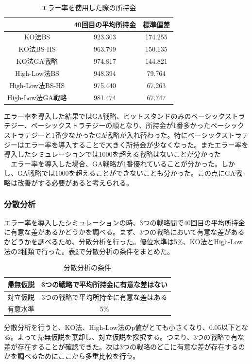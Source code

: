 \begin{table}[H]
 \caption{エラー率を使用した際の所持金\label{money-err}}
 \begin{center}
  \begin{tabular}{|c|c|c|}
  \hline  & 40回目の平均所持金 & 標準偏差 \\
  \hline KO法BS & 923.303 & 174.255\\
  \hline KO法BS-HS & 963.799 & 150.135 \\
  \hline KO法GA戦略 & 974.817 & 144.821\\
  \hline High-Low法BS & 948.394 & 79.764\\
  \hline High-Low法BS-HS  & 975.440 & 67.263\\
  \hline High-Low法GA戦略 & 981.474 & 67.747\\
  \hline
  \end{tabular}
 \end{center}
\end{table}
エラー率を導入した結果ではGA戦略、ヒットスタンドのみのベーシックストラテジー、ベーシックストラテジーの順となり、所持金が1番多かったベーシックストラテジーと1番少なかったGA戦略が入れ替わった。特にベーシックストラテジーはエラー率を導入することで大きく所持金が少なくなった。またエラー率を導入したシミュレーションでは1000を超える戦略はないことが分かった\\
　エラー率を導入した場合、GA戦略が1番優れていることが分かった。しかし、GA戦略では1000を超えることができないことも分かった。この点にGA戦略は改善がする必要があると考えられる。

\subsubsection{分散分析}
エラー率を導入したシミュレーションの時、3つの戦略間で40回目の平均所持金に有意な差があるかどうかを調べる。まず、3つの戦略において有意な差があるかどうかを調べるため、分散分析を行った。優位水準は5\%、KO法とHigh-Low法の2種類で行った。表\ref{conditions-b}で分散分析の条件をまとめた。
\begin{table}[H]
 \caption{分散分析の条件\label{conditions-b}}
 \begin{center}
  \begin{tabular}{|c|c|}
  \hline 帰無仮説 & 3つの戦略で平均所持金に有意な差はない \\
  \hline 対立仮説 & 3つの戦略で平均所持金に有意な差はある \\
  \hline 有意水準 & 5\% \\
  \hline
  \end{tabular}
 \end{center}
\end{table}
分散分析を行うと、KO法、High-Low法のp値がとても小さくなり、0.05以下となる。よって帰無仮説を棄却し、対立仮説を採択する。つまり、3つの戦略で有な差が存在することが確認できた。次は3つの戦略のどこに有意な差が存在するのかを調べるためにここから多重比較を行う。

